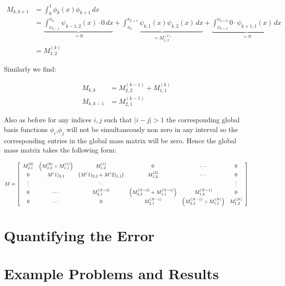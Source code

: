 \begin{align*}
    M_{k,k+1} &= \int_0^1\phi_k(x)\phi_{k+1}\, dx \\
              &= \underbrace{\int_{x_{k-1}}^{x_k}\psi_{k-1,2}(x) \cdot 0\, dx}_{ = 0}
               + \underbrace{\int_{x_k}^{x_{k+1}}\psi_{k,1}(x)\psi_{k,2}(x)\, dx}_{= M^{(k)}_{1,2}}
               + \underbrace{\int_{x_{k+1}}^{x_{k+2}}0 \cdot \psi_{k+1,1}(x)\, dx}_{= 0} \\
              &= M^{(k)}_{1,2}
\end{align*}

Similarly we find:

\begin{align*}
    M_{k,k} &= M^{(k-1)}_{2,2} + M^{(k)}_{1,1} \\
    M_{k,k-1} &= M^{(k-1)}_{2,1}
\end{align*}

Also as before for any indices $i,j$ such that $|i - j| > 1$ the corresponding
global basis functions $\phi_i$,$\phi_j$ will not be simultaneously non zero in
any interval so the corresponding entries in the global mass matrix will be
zero. Hence the global mass matrix takes the following form:

\begin{equation}\label{eq:oned-deterministic-global-mass}
    M = \left[\begin{array}{c c c c c c}
            M^{(0)}_{2,1} & \left(M^{(0)}_{2,2} + M^{(1)}_{1,1}\right) & M^{(1)}_{1,2} & 0 & \cdots & 0 \\
            0 & M^(1)_{2,1} & \left(M^(1)_{2,2} + M^(2)_{1,1}\right) & M^{(2)}_{1,2} & \cdots & 0 \\
            \vdots & & \ddots & & & \vdots \\
            0 & \cdots & M^{(N-2)}_{2,1} & \left(M^{(N-2)}_{2,2} + M^{(N-1)}_{1,1}\right) & M^{(N-1)}_{1,2} & 0  \\
            0 &\cdots & 0 & M^{(N-1)}_{2,1} & \left(M^{(N-1)}_{2,2} + M^{(N)}_{1,1}\right) & M^{(N)}_{1,2}
        \end{array}\right]
\end{equation}

\section{Quantifying the Error}


\section{Example Problems and Results}

